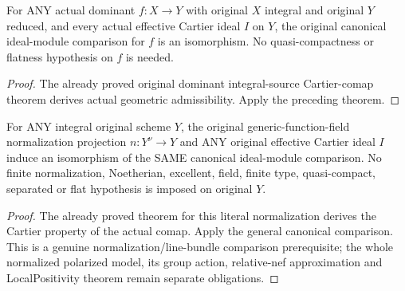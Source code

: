\begin{corollary}
\label{cor:dominant-integral-cartier-canonical-module-pullback}
\leanok
{}
For ANY actual dominant $f:X\to Y$ with original $X$ integral and
original $Y$ reduced, and every actual effective Cartier ideal $I$ on $Y$,
the original canonical ideal-module comparison for $f$ is an isomorphism.
No quasi-compactness or flatness hypothesis on $f$ is needed.
\end{corollary}
\begin{proof}
The already proved original dominant integral-source Cartier-comap theorem
derives actual geometric admissibility. Apply the preceding theorem.
\end{proof}

\begin{corollary}
\label{cor:normalization-cartier-canonical-module-pullback}
\leanok
{}
For ANY integral original scheme $Y$, the original generic-function-field
normalization projection $n:Y^\nu\to Y$ and ANY original effective Cartier
ideal $I$ induce an isomorphism of the SAME canonical ideal-module comparison.
No finite normalization, Noetherian, excellent, field, finite type,
quasi-compact, separated or flat hypothesis is imposed on original $Y$.
\end{corollary}
\begin{proof}
The already proved theorem for this literal normalization derives the
Cartier property of the actual comap. Apply the general canonical comparison.
This is a genuine normalization/line-bundle comparison prerequisite; the
whole normalized polarized model, its group action, relative-nef
approximation and LocalPositivity theorem remain separate obligations.
\end{proof}
